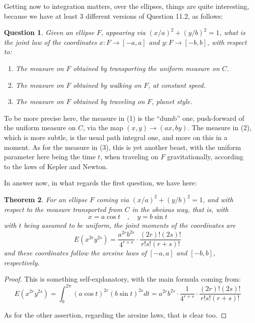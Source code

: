\documentclass[12pt]{amsbook}
\newtheorem{theorem}{Theorem}[chapter]
\newtheorem{question}[theorem]{Question}
\begin{document}
Getting now to integration matters, over the ellipses, things are quite interesting, because we have at least 3 different versions of Question 11.2, as follows:

\begin{question}
Given an ellipse $F$, appearing via $(x/a)^2+(y/b)^2=1$, what is the joint law of the coordinates $x:F\to[-a,a]$ and $y:F\to[-b,b]$, with respect to:
\begin{enumerate}
\item The measure on $F$ obtained by transporting the uniform measure on $C$.

\item The measure on $F$ obtained by walking on $F$, at constant speed.

\item The measure on $F$ obtained by traveling on $F$, planet style.
\end{enumerate}
\end{question}

To be more precise here, the measure in (1) is the ``dumb'' one, push-forward of the uniform measure on $C$, via the map $(x,y)\to(ax,by)$. The measure in (2), which is more subtle, is the usual path integral one, and more on this in a moment. As for the measure in (3), this is yet another beast, with the uniform parameter here being the time $t$, when traveling on $F$ gravitationally, according to the laws of Kepler and Newton.

\bigskip

In answer now, in what regards the first question, we have here:

\begin{theorem}
For an ellipse $F$ coming via $(x/a)^2+(y/b)^2=1$, and with respect to the measure transported from $C$ in the obvious way, that is, with 
$$x=a\cos t\quad,\quad y=b\sin t$$
with $t$ being assumed to be uniform, the joint moments of the coordinates are
$$E(x^{2r}y^{2s})=\frac{a^{2r}b^{2s}}{4^{r+s}}\cdot\frac{(2r)!(2s)!}{r!s!(r+s)!}$$
and these coordinates follow the arcsine laws of $[-a,a]$ and $[-b,b]$, respectively.
\end{theorem}

\begin{proof}
This is something self-explanatory, with the main formula coming from:
$$E(x^{2r}y^{2s})=\int_0^{2\pi}(a\cos t)^{2r}(b\sin t)^{2s}dt=a^{2r}b^{2s}\cdot\frac{1}{4^{r+s}}\cdot\frac{(2r)!(2s)!}{r!s!(r+s)!}$$

As for the other assertion, regarding the arcsine laws, that is clear too.
\end{proof}
\end{document}
